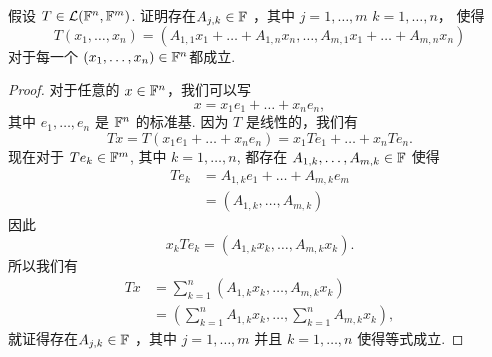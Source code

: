 
\begin{problem}{3}
  假设 $T\in \mathcal{L}(\mathbb{F}^n,\mathbb{F}^m)$.  
  证明存在$A_{j,k}\in\mathbb{F}$ ，其中 $j=1,\dots,m$
   $k=1,\dots,n$， 使得
  \begin{equation*}
  T(x_1,\dots,x_n) = (A_{1,1}x_1 + \dots + A_{1,n}x_n,\dots, A_{m,1}x_1 + \dots + A_{m,n}x_n)
  \end{equation*}
  对于每一个 $(x_1,\dots,x_n)\in\mathbb{F}^n$都成立.
\end{problem}
\begin{proof}[Proof]
  对于任意的 $x\in\mathbb{F}^n$，我们可以写 
  \begin{equation*}
    x = x_1 e_1 + \dots + x_n e_n,
  \end{equation*}
  其中 $e_1,\dots,e_n$ 是 $\mathbb{F}^n$ 的标准基.  
  因为 $T$ 是线性的，我们有
  \begin{equation*}
    Tx = T(x_1 e_1 + \dots +x_n e_n) = x_1 Te_1 + \dots + x_n Te_n.
  \end{equation*}
  现在对于 $Te_k\in\mathbb{F}^m$, 其中 $k=1,\dots, n$, 都存在 
  $A_{1,k},\dots, A_{m,k}\in\mathbb{F}$ 使得
  \begin{align*}
    Te_k &= A_{1,k}e_1 + \dots + A_{m,k}e_m\\
        &= \left(A_{1,k}, \dots, A_{m,k}\right)
  \end{align*}
  因此
  \begin{equation*}
    x_kTe_k = \left(A_{1,k}x_k, \dots, A_{m,k}x_k\right).
  \end{equation*}
  所以我们有
  \begin{align*}
    Tx &= \sum_{k = 1}^n \left(A_{1,k}x_k, \dots, A_{m,k}x_k\right)\\
       &= \left(\sum_{k = 1}^nA_{1,k}x_k, \dots, \sum_{k = 1}^nA_{m,k}x_k \right),
  \end{align*}
  就证得存在$A_{j,k}\in\mathbb{F}$ ，其中 $j=1,\dots,m$ 并且 $k=1,\dots,n$ 使得等式成立.
\end{proof}
